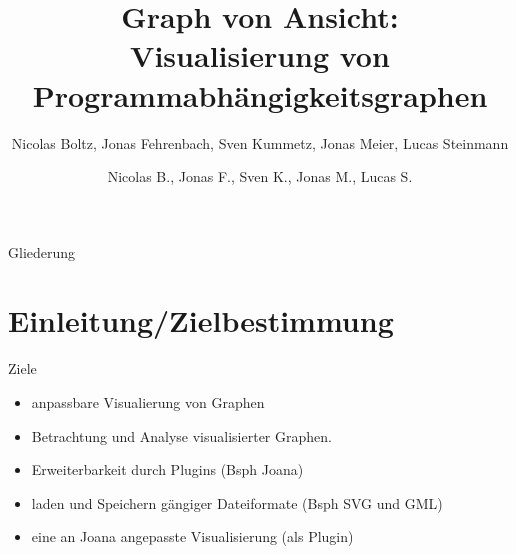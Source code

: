 \documentclass[18pt]{beamer}
\title[Graph von Ansicht]{Graph von Ansicht:\\ Visualisierung von Programmabhängigkeitsgraphen}
\subtitle{}
\author{Nicolas Boltz, Jonas Fehrenbach, Sven Kummetz, Jonas Meier, Lucas Steinmann}
\institute{}
\begin{document}

\begin{frame}
\titlepage
\end{frame}

\author{Nicolas B., Jonas F., Sven K., Jonas M., Lucas S.}
\begin{frame}{Gliederung}
\tableofcontents
\end{frame}

\section{Einleitung/Zielbestimmung}
\begin{frame}{Ziele}
\begin{itemize}
\item anpassbare Visualierung von Graphen
\pause
\item Betrachtung und Analyse visualisierter Graphen.
\pause
\item Erweiterbarkeit durch Plugins (Bsph Joana)
\pause
\item laden und Speichern gängiger Dateiformate (Bsph SVG und GML)
\pause
\item eine an Joana angepasste Visualisierung (als Plugin)
\end{itemize}
\end{frame}
\end{document}
